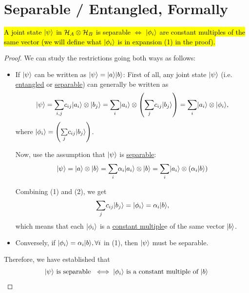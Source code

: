 \documentclass[12pt]{article}
\begin{document}
\section{Separable / Entangled, Formally}
\begin{proposition}\label{prop:cond-for-separability}
\hl{A joint state $\Ket{\psi}$ in $\HHH_A\otimes \HHH_B$ is separable $\iff$ $\Ket{\phi_i}$ are constant multiples of the same vector (we will define what $\Ket{\phi_i}$ is in expansion (1) in the proof).}
\end{proposition}
\begin{proof}
We can study the restrictions going both ways as follows:
\begin{itemize}
    \item If $\Ket{\psi}$ can be written as $\Ket{\psi} = \Ket{a} \Ket{b}$: First of all, any joint state $\Ket{\psi}$ (i.e. \underline{entangled} or \underline{separable}) can generally be written as
    \begin{equation}
    \Ket{\psi} = \underset{i,j}{\sum}c_{ij}\Ket{a_i}\otimes \Ket{b_j} = \underset{i}{\sum}\Ket{a_i}\otimes \prt{\underset{j}{\sum}c_{ij}\Ket{b_j}} = \underset{i}{\sum}\Ket{a_i}\otimes \Ket{\phi_i},
    \end{equation} where $\Ket{\phi_i} = \prt{\underset{j}{\sum}c_{ij}\Ket{b_j}}$.

    Now, use the assumption that $\Ket{\psi}$ is \underline{separable}:
    \begin{equation}
    \Ket{\psi} = \Ket{a}\otimes \Ket{b} = \underset{i}{\sum}\alpha_i \Ket{a_i} \otimes \Ket{b} = \underset{i}{\sum} \Ket{a_i} \otimes \prt{\alpha_i\Ket{b}}
    \end{equation}

    Combining (1) and (2), we get $$
    \underset{j}{\sum}c_{ij}\Ket{b_j} = \Ket{\phi_i} = \alpha_i\Ket{b},
    $$ which means that each $\Ket{\phi_i}$ is a \underline{constant multiple}e of the same vector $\Ket{b}$.
    \item Conversely, if $\Ket{\phi_i} = \alpha_i \Ket{b},\forall i$ in (1), then $\Ket{\psi}$ must be separable.
\end{itemize}

\noindent Therefore, we have established that $$
\Ket{\psi}\text{ is separable }\iff\Ket{\phi_i}\text{ is a constant multiple of $\Ket{b}$}
$$
\end{proof}
\end{document}
